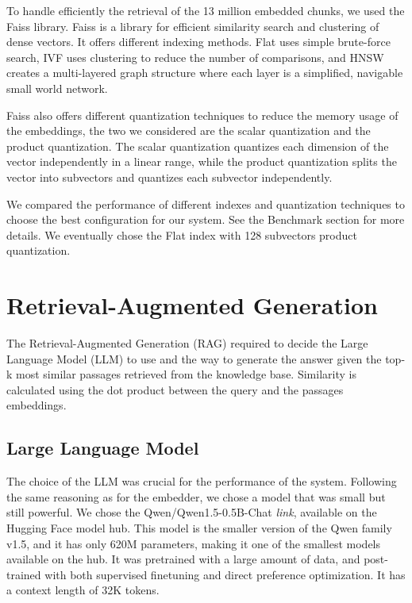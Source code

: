 \documentclass[11pt]{article}
\begin{document}
To handle efficiently the retrieval of the 13 million embedded chunks, we used the Faiss library. 
Faiss is a library for efficient similarity search and clustering of dense vectors. 
It offers different indexing methods. Flat uses simple brute-force search, 
IVF uses clustering to reduce the number of comparisons,
and HNSW creates a multi-layered graph structure where each layer is a simplified, 
navigable small world network. 

Faiss also offers different quantization techniques to reduce the memory usage of the embeddings, 
the two we considered are the scalar quantization and the product quantization. 
The scalar quantization quantizes each dimension of the vector independently in a linear
range, while the product quantization splits the vector into subvectors and quantizes each
subvector independently.

We compared the performance of different indexes and quantization techniques to choose the best
configuration for our system. See the Benchmark section for more details.
We eventually chose the Flat index with 128 subvectors product quantization.

\section{Retrieval-Augmented Generation}

The Retrieval-Augmented Generation (RAG) required to decide the Large Language Model (LLM) to use 
and the way to generate the answer given the top-k most similar passages retrieved from the knowledge base.
Similarity is calculated using the dot product between the query and the passages embeddings.

\subsection{Large Language Model}

The choice of the LLM was crucial for the performance of the system. Following the
same reasoning as for the embedder, we chose a model that was small but still powerful.
We chose the Qwen/Qwen1.5-0.5B-Chat \textit{link}, available on the Hugging Face model hub. 
This model is the smaller version of the Qwen family v1.5, and it has only 620M parameters, making
it one of the smallest models available on the hub.
It was pretrained with a large amount of data, and post-trained with both supervised finetuning 
and direct preference optimization. It has a context length of 32K tokens.
\end{document}
